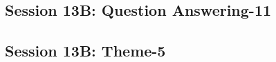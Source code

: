 \subsection{\large Session 13B: Question Answering-11}
\label{parallel-session-13B-trackG}
\TrackGLoc\hfill\sessionchair{}{}
\clearpage
\subsection{\large Session 13B: Theme-5}
\label{parallel-session-13B-trackH}
\TrackHLoc\hfill\sessionchair{}{}
\clearpage


